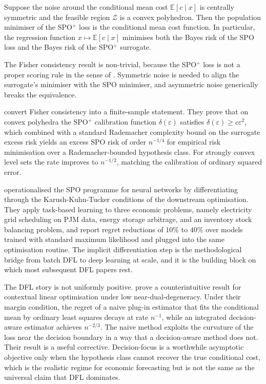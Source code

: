 \begin{theorem}
\label{thm:spo_fisher}
Suppose the noise around the conditional mean cost $\mathbb E[c \mid x]$ is centrally
symmetric and the feasible region $\mathcal Z$ is a convex polyhedron. Then the
population minimiser of the SPO$^+$ loss is the conditional mean cost function. In
particular, the regression function $x \mapsto \mathbb E[c \mid x]$ minimises both
the Bayes risk of the SPO loss and the Bayes risk of the SPO$^+$ surrogate.
\end{theorem}

The Fisher consistency result is non-trivial, because the SPO$^+$ loss is not a
proper scoring rule in the sense of \citet{GneitingRaftery2007}. Symmetric noise is
needed to align the surrogate's minimiser with the SPO minimiser, and asymmetric
noise generically breaks the equivalence.

\citet{LiuGrigas2021} convert Fisher consistency into a finite-sample statement. They
prove that on convex polyhedra the SPO$^+$ calibration function $\delta(\varepsilon)$
satisfies $\delta(\varepsilon) \ge c \varepsilon^2$, which combined with a standard
Rademacher complexity bound on the surrogate excess risk yields an excess SPO risk
of order $n^{-1/4}$ for empirical risk minimisation over a Rademacher-bounded
hypothesis class. For strongly convex level sets the rate improves to $n^{-1/2}$,
matching the calibration of ordinary squared error.

\citet{DontiAmosKolter2017} operationalised the SPO programme for neural networks by
differentiating through the Karush-Kuhn-Tucker conditions of the downstream
optimisation. They apply task-based learning to three economic problems, namely
electricity grid scheduling on PJM data, energy storage arbitrage, and an inventory
stock balancing problem, and report regret reductions of $10\%$ to $40\%$ over models
trained with standard maximum likelihood and plugged into the same optimisation
routine. The implicit differentiation step is the methodological bridge from
batch DFL to deep learning at scale, and it is the building block on which most
subsequent DFL papers rest.

The DFL story is not uniformly positive. \citet{HuKallus2020} prove a counterintuitive
result for contextual linear optimisation under low near-dual-degeneracy. Under their
margin condition, the regret of a naive plug-in estimator that fits the conditional
mean by ordinary least squares decays at rate $n^{-1}$, while an integrated decision-aware
estimator achieves $n^{-2/3}$. The naive method exploits the curvature of the loss
near the decision boundary in a way that a decision-aware method does not. Their
result is a useful corrective. Decision-focus is a worthwhile asymptotic objective
only when the hypothesis class cannot recover the true conditional cost, which is
the realistic regime for economic forecasting but is not the same as the universal
claim that DFL dominates.

